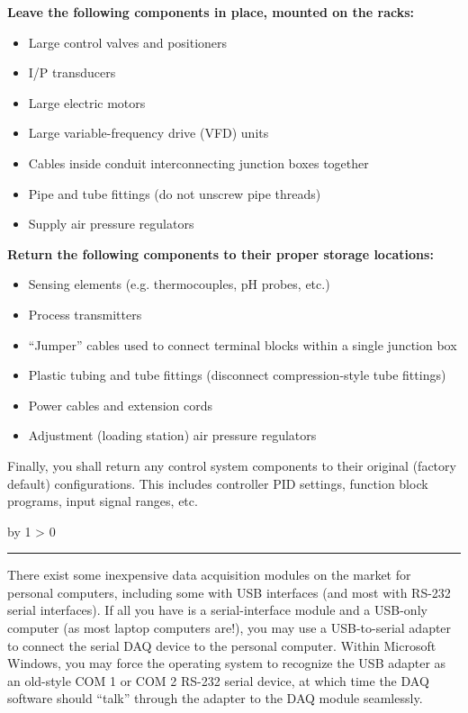 \documentclass[12pt,a4paper]{article}
\def\svar{
           \advance\answnum by 1
           \ifnum \answnum > 0
                \hrule
                \vskip 3pt
                \leftline{Svar \the\answnum}
                \vskip 3pt \fi}
\begin{document}
\begin{itemize}
\vskip 10pt

\indent
{\bf Leave the following components in place, mounted on the racks:}

\begin{itemize}
\item{} Large control valves and positioners
\item{} I/P transducers
\item{} Large electric motors
\item{} Large variable-frequency drive (VFD) units
\item{} Cables inside conduit interconnecting junction boxes together
\item{} Pipe and tube fittings (do not unscrew pipe threads)
\item{} Supply air pressure regulators
\end{itemize}

\vskip 10pt

\indent
{\bf Return the following components to their proper storage locations:}

\begin{itemize}
\item{} Sensing elements (e.g. thermocouples, pH probes, etc.)
\item{} Process transmitters
\item{} ``Jumper'' cables used to connect terminal blocks within a single junction box
\item{} Plastic tubing and tube fittings (disconnect compression-style tube fittings)
\item{} Power cables and extension cords
\item{} Adjustment (loading station) air pressure regulators
\end{itemize}

\vskip 10pt

Finally, you shall return any control system components to their original (factory default) configurations.  This includes controller PID settings, function block programs, input signal ranges, etc.


\vskip 10pt \filbreak 





\svar{} 

There exist some inexpensive data acquisition modules on the market for personal computers, including some with USB interfaces (and most with RS-232 serial interfaces).  If all you have is a serial-interface module and a USB-only computer (as most laptop computers are!), you may use a USB-to-serial adapter to connect the serial DAQ device to the personal computer.  Within Microsoft Windows, you may force the operating system to recognize the USB adapter as an old-style COM 1 or COM 2 RS-232 serial device, at which time the DAQ software should ``talk'' through the adapter to the DAQ module seamlessly.


\end{itemize}
\end{document}

